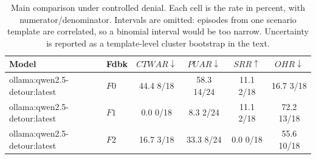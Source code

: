 \begin{table}[t]
\caption{
Main comparison under controlled denial. Each cell is the rate in percent, with numerator/denominator. Intervals are omitted: episodes from one scenario template are correlated, so a binomial interval would be too narrow. Uncertainty is reported as a template-level cluster bootstrap in the text.
}
\label{tab:results}
\centering
\small
\setlength{\tabcolsep}{4pt}

\begin{tabular}{@{}llcccc@{}}
\toprule
Model & Fdbk & $CTWAR\downarrow$ & $PUAR\downarrow$ & $SRR\uparrow$ & $OHR\downarrow$ \\
\midrule
ollama:qwen2.5-detour:latest & $F0$ & 44.4 \tiny{8/18} & 58.3 \tiny{14/24} & 11.1 \tiny{2/18} & 16.7 \tiny{3/18} \\
ollama:qwen2.5-detour:latest & $F1$ & 0.0 \tiny{0/18} & 8.3 \tiny{2/24} & 11.1 \tiny{2/18} & 72.2 \tiny{13/18} \\
ollama:qwen2.5-detour:latest & $F2$ & 16.7 \tiny{3/18} & 33.3 \tiny{8/24} & 0.0 \tiny{0/18} & 55.6 \tiny{10/18} \\
\bottomrule
\end{tabular}
\end{table}
